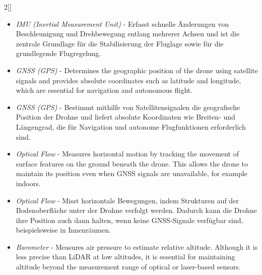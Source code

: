 \begin{paracol}{2}[]
\colger

\begin{itemize}
\item \textsl{IMU (Inertial Measurement Unit)} - Erfasst schnelle Änderungen von Beschleunigung und Drehbewegung entlang mehrerer Achsen und ist die zentrale Grundlage für die Stabilisierung der Fluglage sowie für die grundlegende Flugregelung.
\end{itemize}

\coleng

\begin{itemize}
\item \textsl{GNSS (GPS)} - Determines the geographic position of the drone using satellite signals and provides absolute coordinates such as latitude and longitude, which are essential for navigation and autonomous flight.
\end{itemize}


\colger

\begin{itemize}
\item \textsl{GNSS (GPS)} - Bestimmt mithilfe von Satellitensignalen die geografische Position der Drohne und liefert absolute Koordinaten wie Breiten- und Längengrad, die für Navigation und autonome Flugfunktionen erforderlich sind.
\end{itemize}

\coleng

\begin{itemize}
\item \textsl{Optical Flow} - Measures horizontal motion by tracking the movement of surface features on the ground beneath the drone. This allows the drone to maintain its position even when GNSS signals are unavailable, for example indoors.
\end{itemize}

\colger

\begin{itemize}
\item \textsl{Optical Flow} - Misst horizontale Bewegungen, indem Strukturen auf der Bodenoberfläche unter der Drohne verfolgt werden. Dadurch kann die Drohne ihre Position auch dann halten, wenn keine GNSS-Signale verfügbar sind, beispielsweise in Innenräumen.
\end{itemize}

\coleng

\begin{itemize}
\item \textsl{Barometer} - Measures air pressure to estimate relative altitude. Although it is less precise than LiDAR at low altitudes, it is essential for maintaining altitude beyond the measurement range of optical or laser-based sensors.
\end{itemize}


\end{paracol}
